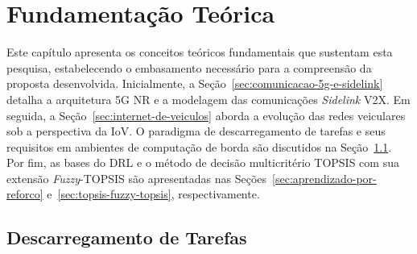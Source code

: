 \chapter{Fundamentação Teórica}
\label{cap:fundamentacao-teorica}

Este capítulo apresenta os conceitos teóricos fundamentais que sustentam esta pesquisa, estabelecendo o embasamento necessário para a compreensão da proposta desenvolvida. Inicialmente, a Seção~\ref{sec:comunicacao-5g-e-sidelink} detalha a arquitetura \gls{5G} \gls{NR} e a modelagem das comunicações \textit{Sidelink} \gls{V2X}. Em seguida, a Seção~\ref{sec:internet-de-veiculos} aborda a evolução das redes veiculares sob a perspectiva da \gls{IoV}. O paradigma de descarregamento de tarefas e seus requisitos em ambientes de computação de borda são discutidos na Seção~\ref{sec:descarregamento-de-tarefas}. Por fim, as bases do \gls{DRL} e o método de decisão multicritério \gls{TOPSIS} com sua extensão \textit{Fuzzy}-\gls{TOPSIS} são apresentadas nas Seções~\ref{sec:aprendizado-por-reforco} e~\ref{sec:topsis-fuzzy-topsis}, respectivamente.






\section{Descarregamento de Tarefas}
\label{sec:descarregamento-de-tarefas}


% 


% 

